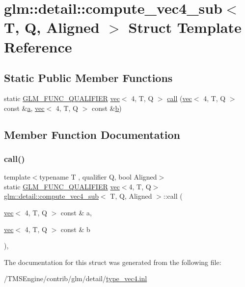 \hypertarget{structglm_1_1detail_1_1compute__vec4__sub}{}\section{glm\+:\+:detail\+:\+:compute\+\_\+vec4\+\_\+sub$<$ T, Q, Aligned $>$ Struct Template Reference}
\label{structglm_1_1detail_1_1compute__vec4__sub}
\subsection*{Static Public Member Functions}
\begin{DoxyCompactItemize}
\item 
static \hyperlink{setup_8hpp_a33fdea6f91c5f834105f7415e2a64407}{G\+L\+M\+\_\+\+F\+U\+N\+C\+\_\+\+Q\+U\+A\+L\+I\+F\+I\+ER} \hyperlink{structglm_1_1vec}{vec}$<$ 4, T, Q $>$ \hyperlink{structglm_1_1detail_1_1compute__vec4__sub_a3f6c03dd3f8dcb8d955a41e8f150094c}{call} (\hyperlink{structglm_1_1vec}{vec}$<$ 4, T, Q $>$ const \&\hyperlink{_s_d_l__opengl__glext_8h_a3309789fc188587d666cda5ece79cf82}{a}, \hyperlink{structglm_1_1vec}{vec}$<$ 4, T, Q $>$ const \&\hyperlink{_s_d_l__opengl__glext_8h_a0f71581a41fd2264c8944126dabbd010}{b})
\end{DoxyCompactItemize}


\subsection{Member Function Documentation}
\mbox{\label{structglm_1_1detail_1_1compute__vec4__sub_a3f6c03dd3f8dcb8d955a41e8f150094c}} 
\subsubsection{\texorpdfstring{call()}{call()}}
{\footnotesize\ttfamily template$<$typename T , qualifier Q, bool Aligned$>$ \\
static \hyperlink{setup_8hpp_a33fdea6f91c5f834105f7415e2a64407}{G\+L\+M\+\_\+\+F\+U\+N\+C\+\_\+\+Q\+U\+A\+L\+I\+F\+I\+ER} \hyperlink{structglm_1_1vec}{vec}$<$4, T, Q$>$ \hyperlink{structglm_1_1detail_1_1compute__vec4__sub}{glm\+::detail\+::compute\+\_\+vec4\+\_\+sub}$<$ T, Q, Aligned $>$\+::call (\begin{DoxyParamCaption}\item[{\hyperlink{structglm_1_1vec}{vec}$<$ 4, T, Q $>$ const \&}]{a,  }\item[{\hyperlink{structglm_1_1vec}{vec}$<$ 4, T, Q $>$ const \&}]{b }\end{DoxyParamCaption})\hspace{0.3cm}{\ttfamily [inline]}, {\ttfamily [static]}}



The documentation for this struct was generated from the following file\+:\begin{DoxyCompactItemize}
\item 
/\+T\+M\+S\+Engine/contrib/glm/detail/\hyperlink{type__vec4_8inl}{type\+\_\+vec4.\+inl}\end{DoxyCompactItemize}
